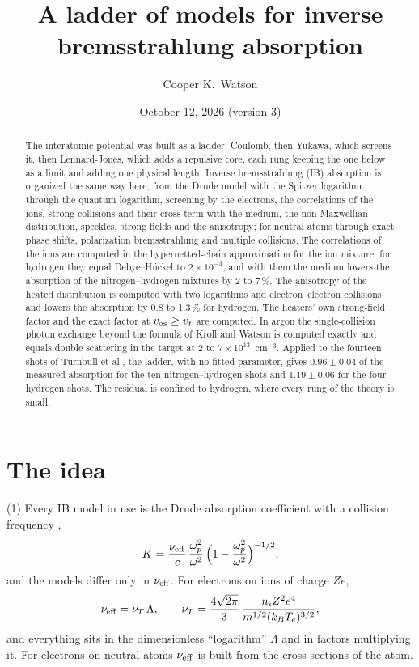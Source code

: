 \documentclass[11pt]{article}
\title{A ladder of models for inverse bremsstrahlung absorption}
\author{Cooper K.\ Watson}
\date{October 12, 2026 (version 3)}
\numberwithin{equation}{section}
\newcommand{\kB}{k_B}
\newcommand{\nueff}{\nu_{\rm eff}}
\newcommand{\vos}{v_{\rm os}}
\begin{document}
\maketitle

\begin{abstract}
\noindent
The interatomic potential was built as a ladder: Coulomb, then Yukawa, which screens
it, then Lennard-Jones, which adds a repulsive core, each rung keeping the one below
as a limit and adding one physical length. Inverse bremsstrahlung (IB) absorption is
organized the same way here, from the Drude model with the Spitzer logarithm through the
quantum logarithm, screening by the electrons, the correlations of the ions, strong
collisions and their cross term with the medium, the non-Maxwellian distribution, speckles,
strong fields and the anisotropy; for neutral atoms through exact phase shifts,
polarization bremsstrahlung and multiple collisions. The correlations of the ions are computed in the hypernetted-chain
approximation for the ion mixture; for hydrogen they equal Debye--H\"uckel to
$2\times10^{-4}$, and with them the medium lowers the absorption of the nitrogen--hydrogen
mixtures by 2 to 7\,\%. The anisotropy of the heated distribution is computed with two logarithms and
electron--electron collisions and lowers the absorption by 0.8 to 1.3\,\% for hydrogen. The
heaters' own strong-field factor and the exact factor at $\vos\ge v_t$ are computed. In argon
the single-collision photon exchange beyond the formula of Kroll and Watson is computed
exactly and equals double scattering in the target at $2$ to $7\times10^{13}$~cm$^{-3}$. Applied
to the fourteen shots of Turnbull et al., the ladder, with no fitted parameter, gives
$0.96\pm0.04$ of the measured absorption for the ten nitrogen--hydrogen shots and
$1.19\pm0.06$ for the four hydrogen shots. The residual is confined to hydrogen, where every
rung of the theory is small.
\end{abstract}

\section{The idea}
\label{sec:idea}

{\noindent}(1) Every IB model in use is the Drude absorption coefficient with a
collision frequency \cite{Atzeni2004},
\begin{equation}
K=\frac{\nueff}{c}\,\frac{\omega_p^2}{\omega^2}\,\Big(1-\frac{\omega_p^2}{\omega^2}\Big)^{-1/2},
\label{eq:K}
\end{equation}
and the models differ only in $\nueff$. For electrons on ions of charge $Ze$,
\begin{equation}
\nueff=\nu_T\,\Lambda,\qquad
\nu_T=\frac{4\sqrt{2\pi}}{3}\,\frac{n_iZ^2e^4}{m^{1/2}(\kB T_e)^{3/2}},
\label{eq:nuT}
\end{equation}
and everything sits in the dimensionless ``logarithm'' $\Lambda$ and in factors
multiplying it. For electrons on neutral atoms $\nueff$ is built from the
cross sections of the atom.
\end{document}
